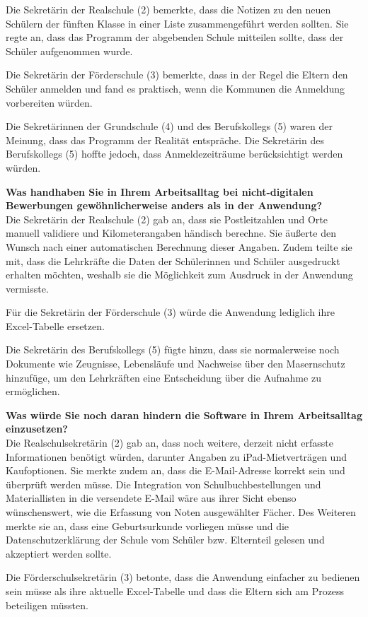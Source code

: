 Die Sekretärin der Realschule (2) bemerkte, dass die Notizen zu den neuen Schülern der fünften Klasse in einer Liste zusammengeführt werden sollten. Sie regte an, dass das Programm der abgebenden Schule mitteilen sollte, dass der Schüler aufgenommen wurde.

Die Sekretärin der Förderschule (3) bemerkte, dass in der Regel die Eltern den Schüler anmelden und fand es praktisch, wenn die Kommunen die Anmeldung vorbereiten würden.

Die Sekretärinnen der Grundschule (4) und des Berufskollegs (5) waren der Meinung, dass das Programm der Realität entspräche. Die Sekretärin des Berufskollegs (5) hoffte jedoch, dass Anmeldezeiträume berücksichtigt werden würden.

\textbf{Was handhaben Sie in Ihrem Arbeitsalltag bei nicht-digitalen Bewerbungen gewöhnlicherweise anders als in der Anwendung?}\\
Die Sekretärin der Realschule (2) gab an, dass sie Postleitzahlen und Orte manuell validiere und Kilometerangaben händisch berechne. Sie äußerte den Wunsch nach einer automatischen Berechnung dieser Angaben. Zudem teilte sie mit, dass die Lehrkräfte die Daten der Schülerinnen und Schüler ausgedruckt erhalten möchten, weshalb sie die Möglichkeit zum Ausdruck in der Anwendung vermisste.

Für die Sekretärin der Förderschule (3) würde die Anwendung lediglich ihre Excel-Tabelle ersetzen.

Die Sekretärin des Berufskollegs (5) fügte hinzu, dass sie normalerweise noch Dokumente wie Zeugnisse, Lebensläufe und Nachweise über den Masernschutz hinzufüge, um den Lehrkräften eine Entscheidung über die Aufnahme zu ermöglichen.

\textbf{Was würde Sie noch daran hindern die Software in Ihrem Arbeitsalltag einzusetzen?}\\
Die Realschulsekretärin (2) gab an, dass noch weitere, derzeit nicht erfasste Informationen benötigt würden, darunter Angaben zu iPad-Mietverträgen und Kaufoptionen. Sie merkte zudem an, dass die E-Mail-Adresse korrekt sein und überprüft werden müsse. Die Integration von Schulbuchbestellungen und Materiallisten in die versendete E-Mail wäre aus ihrer Sicht ebenso wünschenswert, wie die Erfassung von Noten ausgewählter Fächer. Des Weiteren merkte sie an, dass eine Geburtsurkunde vorliegen müsse und die Datenschutzerklärung der Schule vom Schüler bzw. Elternteil gelesen und akzeptiert werden sollte.

Die Förderschulsekretärin (3) betonte, dass die Anwendung einfacher zu bedienen sein müsse als ihre aktuelle Excel-Tabelle und dass die Eltern sich am Prozess beteiligen müssten.

